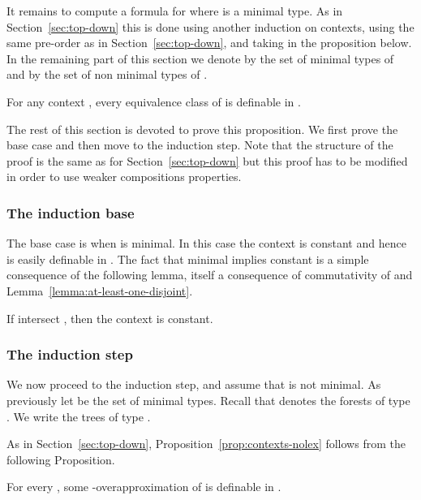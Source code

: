 \documentclass{LMCS}
\begin{document}
{It remains to compute a \Stwo formula for  where  is a minimal type.
As in Section~\ref{sec:top-down} this is done using another induction on
contexts, using the same pre-order as in Section~\ref{sec:top-down}, and taking
 in the proposition below. In the remaining part of this section we
denote by  the set of minimal types of  and by  the set of non minimal
types of .

\begin{prop}\label{prop:contexts-nolex}
  For any context  , every equivalence class of  is definable in
  \Stwo.
\end{prop}

The rest of this section is devoted to prove this proposition. We first prove
the base case and then move to the induction step. Note that the structure of
the proof is the same as for Section~\ref{sec:top-down} but this proof has to
be modified in order to use weaker compositions properties.

\subsubsection{ The induction base}

The base case is when  is minimal. In this case the context   is constant
and hence  is easily definable in \Stwo.  The fact that  minimal
implies  constant is a simple consequence of the following lemma, itself a
consequence of commutativity of  and
Lemma~\ref{lemma:at-least-one-disjoint}.

\begin{lem}\label{lemma:at-least-one-disjoint-nolex}
  If  intersect , then the context   is constant.  
\end{lem}

\subsubsection{The induction step}

We now proceed to the induction step, and assume that  is not
minimal. As previously let  be the set of minimal types. Recall that 
denotes the forests of type . We write  the trees of type .

As in Section~\ref{sec:top-down}, Proposition~\ref{prop:contexts-nolex} follows
from the following Proposition.

\begin{prop}\label{prop:overapprox-nolex}
 For every , some -overapproximation of  is definable in \Stwo.
\end{prop}

}
\end{document}
